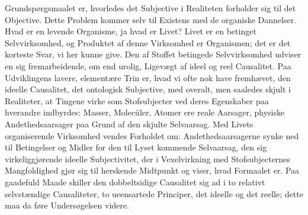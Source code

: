 \documentclass[12pt]{article}
\newcommand{\opage}[1]{\marginnote{\footnotesize\textit{[#1]}}}
\begin{document}
\opage{50} Grundspørgsmaalet er, hvorledes det Subjective i Realiteten
forholder sig til det Objective. Dette Problem kommer selv til
Existens med de organiske Dannelser. Hvad er en levende Organisme,
ja hvad er Livet? Livet er en betinget Selvvirksomhed, og Produktet
af denne Virksomhed er Organismen; det er det korteste Svar, vi her
kunne give. Den af Stoffet betingede Selvvirksomhed udviser en sig
fremarbeidende, om end urolig, Ligevægt af ideel og reel Causalitet.
Paa Udviklingens lavere, elementære Trin er, hvad vi ofte nok have
fremhævet, den ideelle Causalitet, det ontologisk Subjective, med
overalt, men saaledes skjult i Realiteter, at Tingene virke som
Stofsubjecter ved deres Egenskaber paa hverandre indbyrdes: Masser,
Molecüler, Atomer ere reale Aarsager, physiske Andethedsaarsager paa
Grund af den skjulte Selvaarsag. Med Livets organiserende Virksomhed
vendes Forholdet om: Andethedsaarsagerne synke ned til Betingelser
og Midler for den til Lyset kommende Selvaarsag, den sig
virkeliggjørende ideelle Subjectivitet, der i Vexelvirkning med
Stofsubjecternes Mangfoldighed gjør sig til herskende Midtpunkt og
viser, hvad Formaalet er. Paa gaadefuld Maade skiller den
dobbeltsidige Causalitet sig ad i to relativt selvstændige
Causaliteter, to ueensartede Principer, det ideelle og det reelle;
dette maa da føre Undersøgelsen videre.


\end{document}
